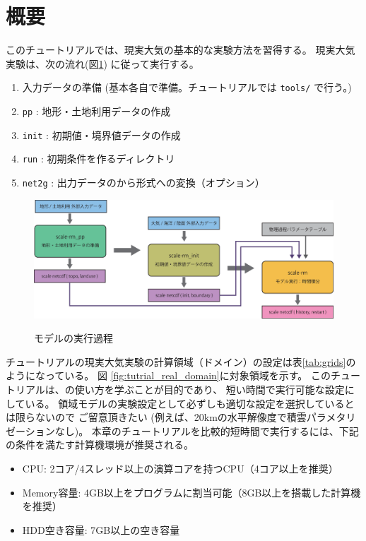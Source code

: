 \section{概要} \label{sec:tutrial_real_intro}
このチュートリアルでは、現実大気の基本的な実験方法を習得する。
現実大気実験は、次の流れ(図\ref{fig:howto}) に従って実行する。
\begin{enumerate}
\item  入力データの準備 (基本各自で準備。チュートリアルでは \verb|tools/| で行う。)
\item  \texttt{pp}      : 地形・土地利用データの作成
\item  \texttt{init}    : 初期値・境界値データの作成
\item  \texttt{run}     : 初期条件を作るディレクトリ
\item  \texttt{net2g}   : 出力データの\netcdf から\grads 形式への変換（オプション） 
\end{enumerate}

\begin{figure}[b]
\begin{center}
  \includegraphics[width=0.9\hsize]{./figure/real_procedure.eps}\\
  \caption{\scalerm モデルの実行過程}
  \label{fig:howto}
\end{center}
\end{figure}


チュートリアルの現実大気実験の計算領域（ドメイン）の設定は表\ref{tab:grids}のようになっている。
図 \ref{fig:tutrial_real_domain}に対象領域を示す。
このチュートリアルは、\scalerm の使い方を学ぶことが目的であり、
短い時間で実行可能な設定にしている。
領域モデルの実験設定として必ずしも適切な設定を選択しているとは限らないので
ご留意頂きたい
(例えば、20kmの水平解像度で積雲パラメタリゼーションなし)。
本章のチュートリアルを比較的短時間で実行するには、下記の条件を満たす計算機環境が推奨される。
\begin{itemize}
\item CPU: 2コア/4スレッド以上の演算コアを持つCPU（4コア以上を推奨）
\item Memory容量: 4GB以上をプログラムに割当可能（8GB以上を搭載した計算機を推奨）
\item HDD空き容量: 7GB以上の空き容量
\end{itemize}


